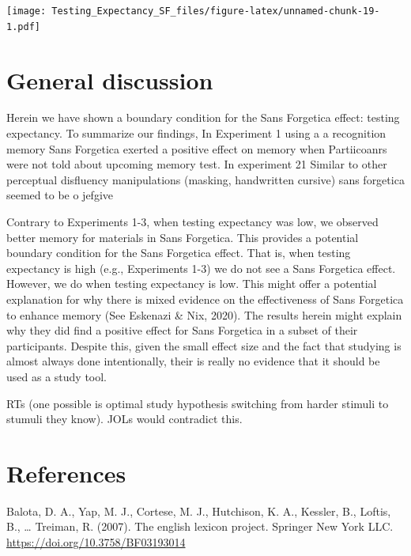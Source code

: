 \documentclass[
  english,
  man]{apa6}
\begin{document}
\texttt{[image: Testing\_Expectancy\_SF\_files/figure-latex/unnamed-chunk-19-1.pdf]}

\hypertarget{general-discussion}{%
\section{General discussion}\label{general-discussion}}

Herein we have shown a boundary condition for the Sans Forgetica effect: testing expectancy. To summarize our findings, In Experiment 1 using a a recognition memory Sans Forgetica exerted a positive effect on memory when Partiicoanrs were not told about upcoming memory test. In experiment 21 Similar to other perceptual disfluency manipulations (masking, handwritten cursive) sans forgetica seemed to be o jefgive

Contrary to Experiments 1-3, when testing expectancy was low, we observed better memory for materials in Sans Forgetica. This provides a potential boundary condition for the Sans Forgetica effect. That is, when testing expectancy is high (e.g., Experiments 1-3) we do not see a Sans Forgetica effect. However, we do when testing expectancy is low. This might offer a potential explanation for why there is mixed evidence on the effectiveness of Sans Forgetica to enhance memory (See Eskenazi \& Nix, 2020). The results herein might explain why they did find a positive effect for Sans Forgetica in a subset of their participants. Despite this, given the small effect size and the fact that studying is almost always done intentionally, their is really no evidence that it should be used as a study tool.

RTs (one possible is optimal study hypothesis switching from harder stimuli to stumuli they know). JOLs would contradict this.

\newpage

\hypertarget{references}{%
\section{References}\label{references}}

\begingroup
\setlength{\parindent}{-0.5in}
\setlength{\leftskip}{0.5in}

\hypertarget{refs}{}
\leavevmode\hypertarget{ref-Balota2007}{}%
Balota, D. A., Yap, M. J., Cortese, M. J., Hutchison, K. A., Kessler, B., Loftis, B., \ldots{} Treiman, R. (2007). The english lexicon project. Springer New York LLC. \url{https://doi.org/10.3758/BF03193014}
\end{document}
